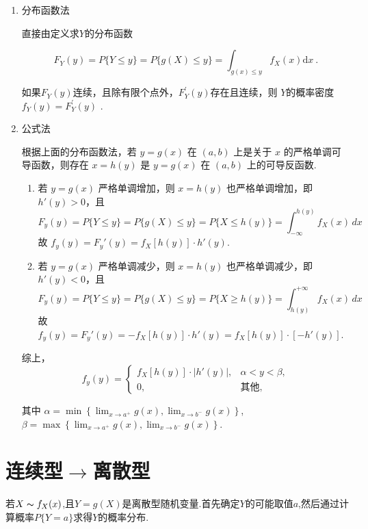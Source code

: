 \begin{enumerate}
      \item 分布函数法

            直接由定义求$Y$的分布函数

            $$F_{Y}(y)=P\{Y\leqslant y\}=P\{g(X)\leqslant y\}=\int_{g(x)\leqslant y}f_{X}(x)\mathrm{d}x\:.$$

            如果$F_Y(y)$连续，且除有限个点外，$F_Y^\prime(y)$存在且连续，则 $Y$的概率密度$f_Y(y)=F_Y^\prime(y)$ .
      \item 公式法 \DTwoThree

            根据上面的分布函数法，若 $y = g(x)$ 在 $(a, b)$ 上是关于 $x$ 的严格单调可导函数，则存在 $x = h(y)$ 是 $y = g(x)$ 在 $(a, b)$ 上的可导反函数.
            \begin{enumerate}
                  \item 若 $y = g(x)$ 严格单调增加，则 $x = h(y)$ 也严格单调增加，即 $h'(y) > 0$，且
                        $$F_y(y) = P\{Y \leqslant y\} = P\{g(X) \leqslant y\} = P\{X \leqslant h(y)\} = \int_{-\infty}^{h(y)} f_X(x) \, dx$$
                        故 $f_y(y) = F_y'(y) = f_X[h(y)] \cdot h'(y)$.
                  \item 若 $y = g(x)$ 严格单调减少，则 $x = h(y)$ 也严格单调减少，即 $h'(y) < 0$，且
                        $$
                              F_y(y) = P\{Y \leqslant y\} = P\{g(X) \leqslant y\} = P\{X \geqslant h(y)\} = \int_{h(y)}^{+\infty} f_X(x) \, dx$$
                        故 $f_y(y) = F_y'(y) = -f_X[h(y)] \cdot h'(y) = f_X[h(y)] \cdot [-h'(y)]$.
            \end{enumerate}

            综上，
            $$f_y(y) = \begin{cases} f_X[h(y)] \cdot |h'(y)|, & \alpha < y < \beta, \\ 0, & \text{其他,} \end{cases}$$

            其中 $\alpha = \min \left\{ \lim_{x \to a^+} g(x), \lim_{x \to b^-} g(x) \right\}$, $\beta = \max \left\{ \lim_{x \to a^+} g(x), \lim_{x \to b^-} g(x) \right\}$.

\end{enumerate}
\section{连续型$\rightarrow$离散型}
若$X\thicksim f_X(x)$,且$Y=g(X)$是离散型随机变量.首先确定$Y$的可能取值$a$,然后通过计算概率$P\{Y=a\}$求得$Y$的概率分布.

